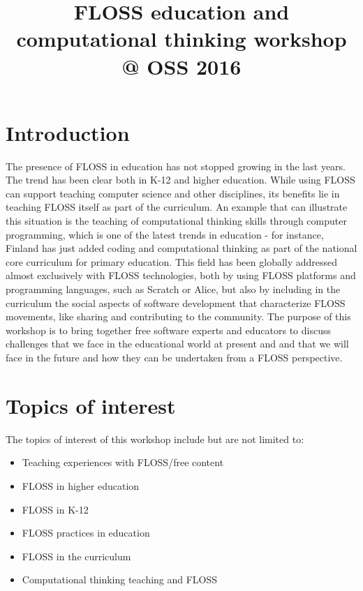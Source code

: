 \documentclass[ifip]{svmult}
\begin{document}
\title*{FLOSS education and computational thinking workshop @ OSS 2016}
\author{}
\institute{}
%
%
\maketitle

\section*{Introduction}
The presence of FLOSS in education has not stopped growing in the last years. The trend has been clear both in K-12 and higher education. While using FLOSS can support teaching computer science and other disciplines, its benefits lie in teaching FLOSS itself as part of the curriculum. An example that can illustrate this situation is the teaching of computational thinking skills through computer programming, which is one of the latest trends in education - for instance, Finland has just added coding and computational thinking as part of the national core curriculum for primary education. This field has been globally addressed almost exclusively with FLOSS technologies, both by using FLOSS platforms and programming languages, such as Scratch or Alice, but also by including in the curriculum the social aspects of software development that characterize FLOSS movements, like sharing and contributing to the community. The purpose of this workshop is to bring together free software experts and educators to discuss challenges that we face in the educational world at present and and that we will face in the future and how they can be undertaken from a FLOSS perspective.

\section*{Topics of interest}
The topics of interest of this workshop include but are not limited to:
\begin{itemize}
 \item Teaching experiences with FLOSS/free content
 \item FLOSS in higher education 
 \item FLOSS in K-12
 \item FLOSS practices in education 
 \item FLOSS in the curriculum 
 \item Computational thinking teaching and FLOSS
\end{itemize}
\end{document}
